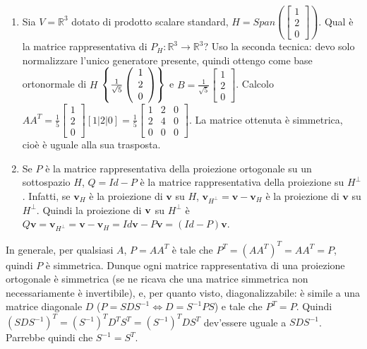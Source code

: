 \documentclass{article}
\begin{document}
\begin{enumerate}
\item Sia $V=%
\mathbb{R}
^{3}$ dotato di prodotto scalare standard, $H=Span\left( \left[ 
\begin{array}{c}
1 \\ 
2 \\ 
0%
\end{array}%
\right] \right) $. Qual \`{e} la matrice rappresentativa di $P_{H}:%
\mathbb{R}
^{3}\rightarrow 
\mathbb{R}
^{3}$? Uso la seconda tecnica: devo solo normalizzare l'unico generatore
presente, quindi ottengo come base ortonormale di $H$ $\left\{ \frac{1}{%
\sqrt{5}}\left( 
\begin{array}{c}
1 \\ 
2 \\ 
0%
\end{array}%
\right) \right\} $ e $B=\frac{1}{\sqrt{5}}\left[ 
\begin{array}{c}
1 \\ 
2 \\ 
0%
\end{array}%
\right] $. Calcolo $AA^{T}=\frac{1}{5}\left[ 
\begin{array}{c}
1 \\ 
2 \\ 
0%
\end{array}%
\right] \left[ 1|2|0\right] =\frac{1}{5}\left[ 
\begin{array}{ccc}
1 & 2 & 0 \\ 
2 & 4 & 0 \\ 
0 & 0 & 0%
\end{array}%
\right] $. La matrice ottenuta \`{e} simmetrica, cio\`{e} \`{e} uguale alla
sua trasposta.

\item Se $P$ \`{e} la matrice rappresentativa della proiezione ortogonale su
un sottospazio $H$, $Q=Id-P$ \`{e} la matrice rappresentativa della
proiezione su $H^{\perp }$. Infatti, se $\mathbf{v}_{H}$ \`{e} la proiezione
di $\mathbf{v}$ su $H$, $\mathbf{v}_{H^{\perp }}=\mathbf{v-v}_{H}$ \`{e} la
proiezione di $\mathbf{v}$ su $H^{\perp }$. Quindi la proiezione di $\mathbf{%
v}$ su $H^{\perp }$ \`{e} $Q\mathbf{v}=\mathbf{v}_{H^{\perp }}=\mathbf{v-v}%
_{H}=Id\mathbf{v-}P\mathbf{v}=\left( Id-P\right) \mathbf{v}$.
\end{enumerate}

In generale, per qualsiasi $A$, $P=AA^{T}$ \`{e} tale che $P^{T}=\left(
AA^{T}\right) ^{T}=AA^{T}=P$, quindi $P$ \`{e} simmetrica. Dunque ogni
matrice rappresentativa di una proiezione ortogonale \`{e} simmetrica (se ne
ricava che una matrice simmetrica non necessariamente \`{e} invertibile), e,
per quanto visto, diagonalizzabile: \`{e} simile a una matrice diagonale $D$
($P=SDS^{-1}\Longleftrightarrow D=S^{-1}PS$) e tale che $P^{T}=P$. Quindi $%
\left( SDS^{-1}\right) ^{T}=\left( S^{-1}\right) ^{T}D^{T}S^{T}=\left(
S^{-1}\right) ^{T}DS^{T}$ dev'essere uguale a $SDS^{-1}$. Parrebbe quindi
che $S^{-1}=S^{T}$.
\end{document}
